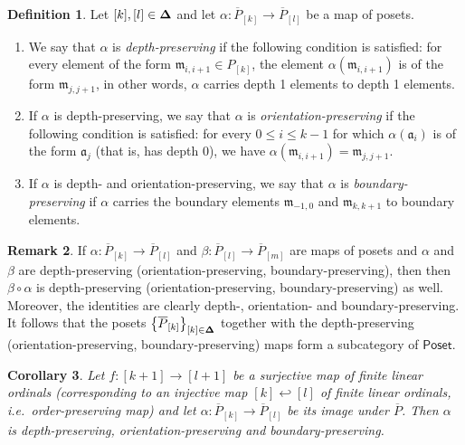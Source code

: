 \documentclass[10pt, reqno, twoside
, final
]{amsart}
\numberwithin{equation}{subsection}%
\theoremstyle{definition}
\newtheorem{defn}{Definition}[subsection]
\theoremstyle{definition}
\theoremstyle{definition}
\theoremstyle{definition}
\theoremstyle{definition}
\theoremstyle{definition}
\theoremstyle{definition}
\theoremstyle{definition}
\theoremstyle{definition}
\theoremstyle{plain}
\theoremstyle{definition}
\theoremstyle{plain}
\theoremstyle{definition}
\theoremstyle{plain}
\newtheorem{cor}[defn]{Corollary}
\theoremstyle{definition}
\newtheorem{rmk}[defn]{Remark}
\theoremstyle{definition}
\theoremstyle{plain}
\theoremstyle{plain}
\theoremstyle{definition}
\theoremstyle{plain}
\theoremstyle{plain}
\theoremstyle{plain}
\begin{document}
\begin{defn}\label{defn:depthorientationpreserving}
Let $[k],[l]\in\boldsymbol{\Delta}$ and let $\alpha:\overline{P}_{[k]}\rightarrow \overline{P}_{[l]}$ be a  map of posets. 
\begin{enumerate}[$(1)$]
    \item We say that $\alpha$ is \emph{depth-preserving} if the following condition is satisfied: for every element of the form $\mathfrak{m}_{i,i+1}\in P_{[k]}$, the element $\alpha(\mathfrak{m}_{i,i+1})$ is of the form $\mathfrak{m}_{j,j+1}$, in other words, $\alpha$ carries depth 1 elements to depth 1 elements.
    \item If $\alpha$ is depth-preserving, we say that $\alpha$ is \emph{orientation-preserving} if the following condition is satisfied: for every $0\leq i\leq k-1$ for which $\alpha(\mathfrak{a}_i)$ is of the form $\mathfrak{a}_j$ (that is, has depth $0$), we have $\alpha(\mathfrak{m}_{i,i+1})=\mathfrak{m}_{j,j+1}$.
    \item If $\alpha$ is depth- and orientation-preserving, we say that $\alpha$ is \emph{boundary-preserving} if $\alpha$ carries the boundary elements $\mathfrak{m}_{-1,0}$ and $\mathfrak{m}_{k,k+1}$ to boundary elements.
\end{enumerate}
\end{defn}
\begin{rmk}\label{rmk:depthorientationcompose}
If $\alpha:\overline{P}_{[k]}\rightarrow \overline{P}_{[l]}$ and $\beta:\overline{P}_{[l]}\rightarrow \overline{P}_{[m]}$ are maps of posets and $\alpha$ and $\beta$ are depth-preserving (orientation-preserving, boundary-preserving), then then $\beta\circ \alpha$ is depth-preserving (orientation-preserving, boundary-preserving) as well. Moreover, the identities are clearly depth-, orientation- and boundary-preserving. It follows that the posets $\left\{\overline{P}_{[k]}\right\}_{[k]\in\boldsymbol{\Delta}}$ together with the depth-preserving (orientation-preserving, boundary-preserving) maps form a subcategory of $\mathsf{Poset}$.
\end{rmk}
\begin{cor}\label{cor:posetfunctordepthor}
Let $f:[k+1]\rightarrow  [l+1]$ be a surjective map of finite linear ordinals (corresponding to an \emph{injective} map $[k]\hookleftarrow [l]$ of finite linear ordinals, i.e.~order-preserving map) and let $\alpha:\overline{P}_{[k]}\rightarrow \overline{P}_{[l]}$ be its image under $\overline{P}$. Then $\alpha$ is depth-preserving, orientation-preserving and boundary-preserving. 
\end{cor}
\end{document}
